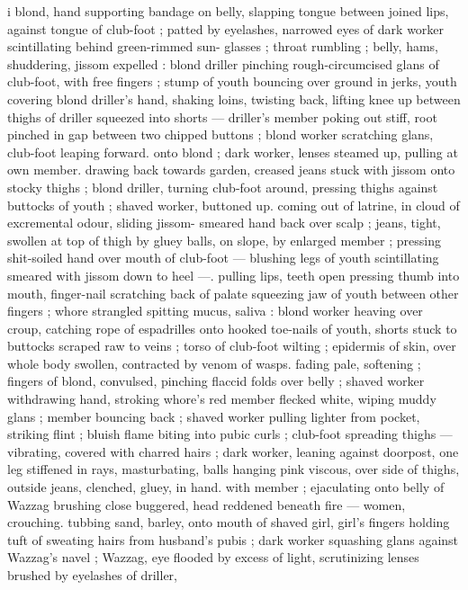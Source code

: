 i blond, hand supporting bandage on belly, slapping tongue between 
joined lips, against tongue of club-foot ; patted by eyelashes, 
narrowed eyes of dark worker scintillating behind green-rimmed sun- 
glasses ; throat rumbling ; belly, hams, shuddering, jissom expelled : 
blond driller pinching rough-circumcised glans of club-foot, with free 
fingers ; stump of youth bouncing over ground in jerks, youth 
covering blond driller's hand, shaking loins, twisting back, lifting 
knee up between thighs of driller squeezed into shorts --- driller's 
member poking out stiff, root pinched in gap between two chipped 
buttons ; blond worker scratching glans, club-foot leaping forward. 
onto blond ; dark worker, lenses steamed up, pulling at own member. 
drawing back towards garden, creased jeans stuck with jissom onto 
stocky thighs ; blond driller, turning club-foot around, pressing 
thighs against buttocks of youth ; shaved worker, buttoned up. 
coming out of latrine, in cloud of excremental odour, sliding jissom- 
smeared hand back over scalp ; jeans, tight, swollen at top of thigh 
by gluey balls, on slope, by enlarged member ; pressing shit-soiled 
hand over mouth of club-foot --- blushing legs of youth scintillating 
smeared with jissom down to heel ---. pulling lips, teeth open 
pressing thumb into mouth, finger-nail scratching back of palate 
squeezing jaw of youth between other fingers ; whore strangled 
spitting mucus, saliva : blond worker heaving over croup, catching 
rope of espadrilles onto hooked toe-nails of youth, shorts stuck to 
buttocks scraped raw to veins ; torso of club-foot wilting ; epidermis 
of skin, over whole body swollen, contracted by venom of wasps. 
fading pale, softening ; fingers of blond, convulsed, pinching flaccid 
folds over belly ; shaved worker withdrawing hand, stroking whore's 
red member flecked white, wiping muddy glans ; member bouncing 
back ; shaved worker pulling lighter from pocket, striking flint ; bluish 
flame biting into pubic curls ; club-foot spreading thighs --- 
vibrating, covered with charred hairs ; dark worker, leaning against 
doorpost, one leg stiffened in rays, masturbating, balls hanging pink 
viscous, over side of thighs, outside jeans, clenched, gluey, in hand. 
with member ; ejaculating onto belly of Wazzag brushing close 
buggered, head reddened beneath fire --- women, crouching. 
tubbing sand, barley, onto mouth of shaved girl, girl's fingers 
holding tuft of sweating hairs from husband's pubis ; dark worker 
squashing glans against Wazzag's navel ; Wazzag, eye flooded by 
excess of light, scrutinizing lenses brushed by eyelashes of driller, 
